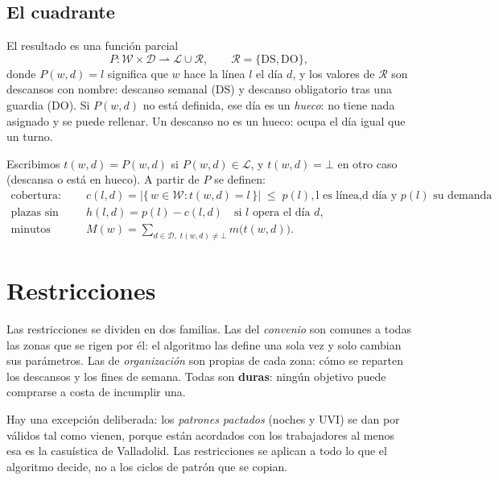 \documentclass[11pt,a4paper]{article}
\newcommand{\Dias}{\mathcal{D}}
\newcommand{\Lin}{\mathcal{L}}
\newcommand{\Trab}{\mathcal{W}}
\newcommand{\Desc}{\mathcal{R}}
\begin{document}
\subsection{El cuadrante}

El resultado es una función parcial
\[
  P : \Trab \times \Dias \rightharpoonup \Lin \cup \Desc,
  \qquad \Desc = \{\mathrm{DS}, \mathrm{DO}\},
\]
donde $P(w,d) = l$ significa que $w$ hace la línea $l$ el día $d$, y los valores de $\Desc$ son
descansos con nombre: descanso semanal (DS) y descanso obligatorio tras una guardia (DO). Si $P(w,d)$ no está definida, ese día es un \emph{hueco}: no
tiene nada asignado y se puede rellenar. Un descanso no es un hueco: ocupa el día igual que un
turno.

Escribimos $t(w,d) = P(w,d)$ si $P(w,d) \in \Lin$, y $t(w,d) = \bot$ en otro caso (descansa o
está en hueco). A partir de $P$ se definen:
\begin{align*}
  \text{cobertura:}\quad & c(l,d) = \bigl|\{\, w \in \Trab : t(w,d) = l \,\}\bigr|
                           \;\le\; p(l), \text{l es línea,d día y }p(l) \text{ su demanda}\\
  \text{plazas sin cubrir:}\quad & h(l,d) = p(l) - c(l,d)
                           \quad \text{si $l$ opera el día $d$}, \\
  \text{minutos trabajados:}\quad & M(w) = \sum_{d \in \Dias,\; t(w,d) \neq \bot} m\bigl(t(w,d)\bigr).
\end{align*}

\section{Restricciones}

Las restricciones se dividen en dos familias. Las del \emph{convenio} son comunes a todas las
zonas que se rigen por él: el algoritmo las define una sola vez y solo cambian sus parámetros.
Las de \emph{organización} son propias de cada zona: cómo se reparten los descansos y los fines
de semana. Todas son \textbf{duras}: ningún objetivo puede comprarse a costa de incumplir una.

Hay una excepción deliberada: los \emph{patrones pactados} (noches y UVI) se dan por válidos
tal como vienen, porque están acordados con los trabajadores al menos esa es la casuística de Valladolid.
 Las restricciones se aplican a
todo lo que el algoritmo decide, no a los ciclos de patrón que se copian.
\end{document}
